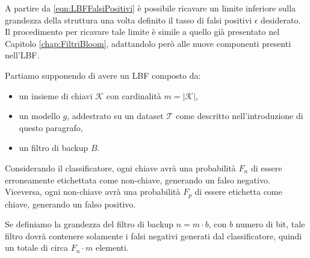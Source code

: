 \documentclass[../../main.tex]{subfiles}
\begin{document}
    A partire da \eqref{eqn:LBFFalsiPositivi} è possibile ricavare un limite inferiore sulla grandezza della struttura una volta definito il tasso di falsi positivi $\epsilon$ desiderato. Il procedimento per ricavare tale limite è simile a quello già presentato nel Capitolo \ref{chap:FiltriBloom}, adattandolo però alle nuove componenti presenti nell'LBF.

    Partiamo supponendo di avere un LBF composto da: 
    \begin{itemize}
        \item un insieme di chiavi $\mathcal{K}$ con cardinalità $m = |\mathcal{K}|$,
        \item un modello $g$, addestrato su un dataset $\mathcal{T}$ come descritto nell'introduzione di questo paragrafo,
        \item un filtro di backup $B$.
    \end{itemize}
    Considerando il classificatore, ogni chiave avrà una probabilità $F_n$ di essere erroneamente etichettata come non-chiave, generando un falso negativo. Viceversa, ogni non-chiave avrà una probabilità $F_p$ di essere etichetta come chiave, generando un falso positivo. 
    
    Se definiamo  la grandezza del filtro di backup $n = m \cdot b$, con $b$ numero di bit, tale filtro dovrà contenere solamente i falsi negativi generati dal classificatore, quindi un totale di circa $F_n \cdot m$ elementi.
\end{document}
